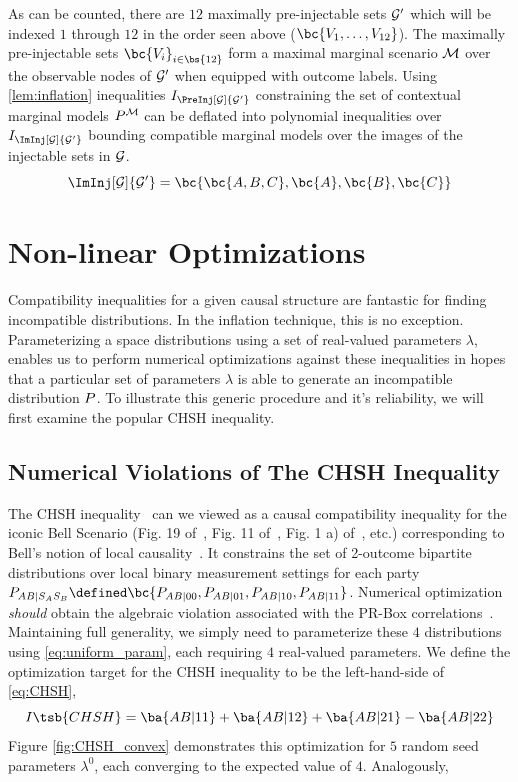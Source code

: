 \documentclass[aps, 10pt, english, twoside, pra, nofootinbib, longbibliography]{revtex4-1}
\begin{document}
    As can be counted, there are $12$ maximally pre-injectable sets ${\mathcal{G}}'$ which will be indexed $1$ through $12$ in the order seen above ($\bc{V_1, \ldots, V_{12}}$). The maximally pre-injectable sets $\bc{V_i}_{i \in \bs{12}}$ form a maximal marginal scenario $\mathcal{M}$ over the observable nodes of ${\mathcal{G}}'$ when equipped with outcome labels. Using \cref{lem:inflation} inequalities $I_{\PreInj[\ts]{\ts'}}$ constraining the set of contextual marginal models $\prob^{\mscenario}$ can be deflated into polynomial inequalities over $I_{\ImInj[\ts]{\ts'}}$ bounding compatible marginal models over the images of the injectable sets in ${\mathcal{G}}$.
    \[ \ImInj[\ts]{\ts'} = \bc{\bc{A, B, C}, \bc{A}, \bc{B}, \bc{C}} \]


    \section{Non-linear Optimizations}
    \label{sec:optimizations}
    Compatibility inequalities for a given causal structure are fantastic for finding incompatible distributions. In the inflation technique, this is no exception. Parameterizing a space distributions using a set of real-valued parameters $\lambda$, enables us to perform numerical optimizations against these inequalities in hopes that a particular set of parameters $\lambda$ is able to generate an incompatible distribution $\prob$. To illustrate this generic procedure and it's reliability, we will first examine the popular CHSH inequality.
    \subsection{Numerical Violations of The CHSH Inequality}
    The CHSH inequality~\cite{CHSH_Original} can we viewed as a causal compatibility inequality for the iconic Bell Scenario (Fig. 19 of~\cite{Wood_2012}, Fig. 11 of~\cite{Inflation}, Fig. 1 a) of~\cite{Tavakoli_2015}, etc.) corresponding to Bell's notion of local causality~\cite{Wood_2012}. It constrains the set of 2-outcome bipartite distributions over local binary measurement settings for each party $\prob[AB\mid S_A S_B] \defined \bc{\prob[AB\mid 0 0], \prob[AB\mid 01], \prob[AB\mid 10], \prob[AB\mid 11]}$. Numerical optimization \textit{should} obtain the algebraic violation associated with the PR-Box correlations~\cite{PR_1995}. Maintaining full generality, we simply need to parameterize these $4$ distributions using \cref{eq:uniform_param}, each requiring $4$ real-valued parameters. We define the optimization target for the CHSH inequality to be the left-hand-side of \cref{eq:CHSH},
    \[ I\tsb{CHSH} = \ba{AB|11} + \ba{AB|12} + \ba{AB|21} - \ba{AB|22} \]
    Figure \ref{fig:CHSH_convex} demonstrates this optimization for $5$ random seed parameters $\lambda^0$, each converging to the expected value of $4$. Analogously,~\cite{Cirelson_1980}
\end{document}
